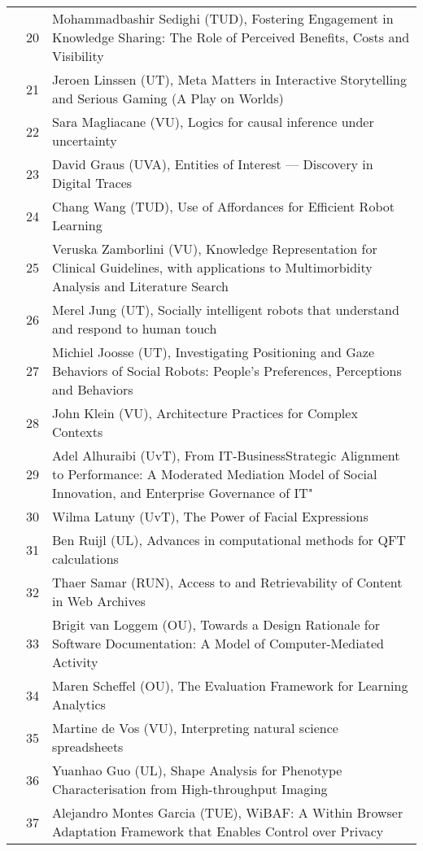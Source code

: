 {\begin{xltabular}{\linewidth}{@{} l @{\hspace{0.5em}} l @{\hspace{1em}} X @{}}
        &	 20	&	 Mohammadbashir Sedighi (TUD), Fostering Engagement in Knowledge Sharing: The Role of Perceived Benefits, Costs and Visibility\\
        &	 21	&	 Jeroen Linssen (UT), Meta Matters in Interactive Storytelling and Serious Gaming (A Play on Worlds)\\
        &	 22	&	 Sara Magliacane (VU), Logics for causal inference under uncertainty\\
        &	 23	&	 David Graus (UVA), Entities of Interest --- Discovery in Digital Traces\\
        &	 24	&	 Chang Wang (TUD), Use of Affordances for Efficient Robot Learning\\
        &	 25	&	 Veruska Zamborlini (VU), Knowledge Representation for Clinical Guidelines, with applications to Multimorbidity Analysis and Literature Search\\
        &	 26	&	 Merel Jung (UT), Socially intelligent robots that understand and respond to human touch\\
        &	 27	&	 Michiel Joosse (UT), Investigating Positioning and Gaze Behaviors of Social Robots: People's Preferences, Perceptions and Behaviors\\
        &	 28	&	 John Klein (VU), Architecture Practices for Complex Contexts\\
        &	 29	&	 Adel Alhuraibi (UvT), From IT-BusinessStrategic Alignment to Performance: A Moderated Mediation Model of Social Innovation, and Enterprise Governance of    IT"\\
        &	 30	&	 Wilma Latuny (UvT), The Power of Facial Expressions\\
        &	 31	&	 Ben Ruijl (UL), Advances in computational methods for QFT calculations\\
        &	 32	& 	 Thaer Samar (RUN), Access to and Retrievability of Content in Web Archives\\
        &	 33	&	 Brigit van Loggem (OU), Towards a Design Rationale for Software Documentation: A Model of Computer-Mediated Activity\\
        &	 34	&	 Maren Scheffel (OU), The Evaluation Framework for Learning Analytics \\
        &	 35	&	 Martine de Vos (VU), Interpreting natural science spreadsheets \\
        &	 36	&	 Yuanhao Guo (UL), Shape Analysis for Phenotype Characterisation from High-throughput Imaging \\
        &	 37	&	 Alejandro Montes Garcia (TUE), WiBAF: A Within Browser Adaptation Framework that Enables Control over Privacy \\

\end{xltabular}}

